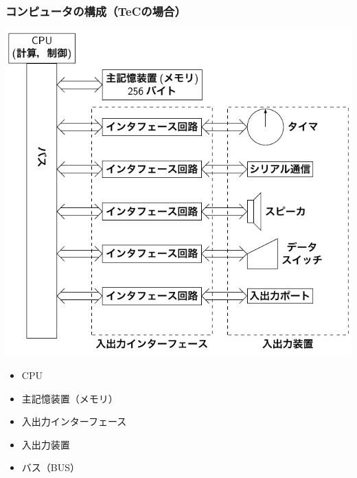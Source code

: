 \documentclass[handout]{beamer}        %
\begin{document}
\begin{frame}
  \frametitle{コンピュータの構成（TeCの場合）}
  \begin{minipage}{0.59\columnwidth}
    \centerline{\includegraphics[scale=0.63]{../Tikz/kousei2.pdf}}
  \end{minipage}
  \begin{minipage}{0.4\columnwidth}
    \begin{itemize}
    \item CPU\\
      \vspace{5ex}
    \item 主記憶装置（メモリ）\\
      \vspace{5ex}
    \item 入出力インターフェース\\
      \vspace{4ex}
    \item 入出力装置\\
      \vspace{4ex}
    \item バス（BUS）\\
      \vspace{6ex}
    \end{itemize}
  \end{minipage}
\end{frame}
\end{document}
